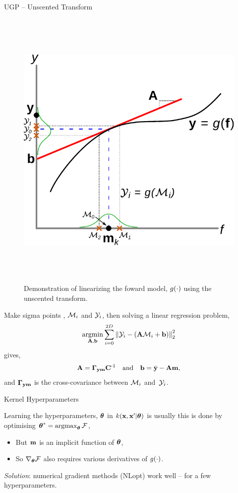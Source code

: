 \documentclass[final]{beamer}
\newlength{\onecolwid}
\begin{document}
\begin{frame}[t]
\begin{columns}[t]
\begin{column}{\onecolwid}
\begin{block}{UGP -- Unscented Transform}

\begin{figure}
    \includegraphics[height=14cm]{fig/statlin}
    \caption{Demonstration of linearizing the foward model, $\nonlin{\cdot}$
        using the unscented transform.}
\end{figure}        

Make sigma points \cite{Julier2004}, $\Sfunc_i$ and $\Sobs_i$, then solving a
linear regression problem,
\begin{equation*}
    \argmin_{\Linmat, \intcpt} \sum^{2D}_{i=0} 
        \lnorm{2}{\Sobs_i - \brac{\Linmat\Sfunc_i + \intcpt}}^2
\end{equation*}
gives,
\begin{equation}
    \Linmat = \xcov \pocov\inv \quad \text{and} \quad
    \intcpt = \bar\obs - \Linmat\pomean,
\end{equation}
and $\xcov$ is the cross-covariance between $\Sfunc_i$ and~$\Sobs_i$.

\end{block}


\begin{block}{Kernel Hyperparameters}

Learning the hyperparameters, $\khypers$ in $\kernl\!\brac{\inobs,
    \inobs'|\khypers}$ is usually this is done by optimising $\khypers^* =
\argmax_{\khypers}\Fengy$,%
\begin{itemize}
    \item But $\pomean$ is an implicit function of $\khypers$,
    \item So $\nabla_{\khypers}\Fengy$ also requires various derivatives of
        $\nonlin{\cdot}$.
\end{itemize}
\emph{Solution}: numerical gradient methods (NLopt) work well -- for
a few hyperparameters.


\end{block}
\end{column}
\end{columns}
\end{frame}
\end{document}
